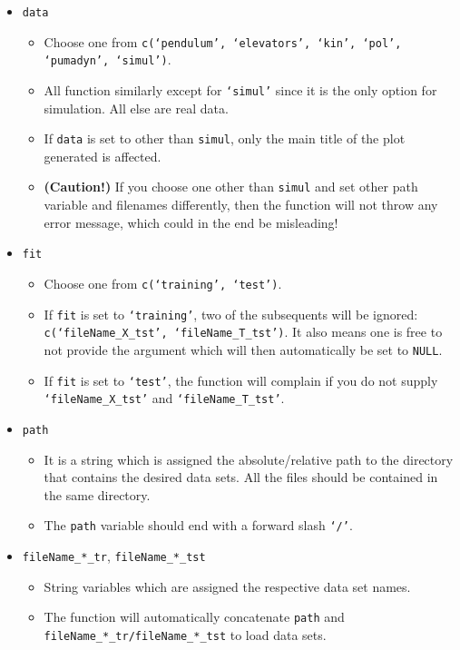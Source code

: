 \documentclass[11pt]{article}
\begin{document}
  \begin{itemize}
    \item \texttt{data}
      \begin{itemize}
        \item Choose one from \texttt{c(`pendulum', `elevators', `kin', `pol', `pumadyn', `simul')}.
        \item All function similarly except for \texttt{`simul'} since it is the only option for simulation. All else are real data.
        \item If \texttt{data} is set to other than \texttt{simul}, only the main title of the plot generated is affected.
        \item \textbf{(Caution!)} If you choose one other than \texttt{simul} and set other path variable and filenames differently, then the function will not throw any error message, which could in the end be misleading! 
      \end{itemize}
    \item \texttt{fit}
      \begin{itemize}
        \item Choose one from \texttt{c(`training', `test')}.
        \item If \texttt{fit} is set to \texttt{`training'}, two of the subsequents will be ignored: \texttt{c(`fileName\_X\_tst', `fileName\_T\_tst')}. It also means one is free to not provide the argument which will then automatically be set to \texttt{NULL}.
        \item If \texttt{fit} is set to \texttt{`test'}, the function will complain if you do not supply \texttt{`fileName\_X\_tst'} and \texttt{`fileName\_T\_tst'}.
      \end{itemize}
    \item \texttt{path}
      \begin{itemize}
        \item It is a string which is assigned the absolute/relative path to the directory that contains the desired data sets. All the files should be contained in the same directory.
        \item The \texttt{path} variable should end with a forward slash \texttt{`/'}.
      \end{itemize}
    \item \texttt{fileName\_*\_tr}, \texttt{fileName\_*\_tst}
      \begin{itemize}
        \item String variables which are assigned the respective data set names.
        \item The function will automatically concatenate \texttt{path} and \texttt{fileName\_*\_tr/fileName\_*\_tst} to load data sets.
      \end{itemize}
  \end{itemize}
\end{document}
